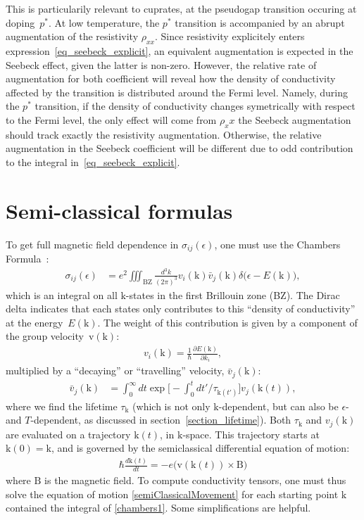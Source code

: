 \documentclass[notitlepage,11pt,nofootinbib]{revtex4-1}
\renewcommand{\vec}[1]{\bm{\mathrm{#1}}}
\begin{document}
This is particularily relevant to cuprates, at the pseudogap transition occuring at doping~$p^*$. At low temperature, the $p^*$ transition is accompanied by an abrupt augmentation of the resistivity $\rho_{xx}$. Since resistivity explicitely enters expression~\eqref{eq_seebeck_explicit}, an equivalent augmentation is expected in the Seebeck effect, given the latter is non-zero. However, the relative rate of augmentation for both coefficient will reveal how the density of conductivity affected by the transition is distributed around the Fermi level. Namely, during the $p^*$ transition, if the density of conductivity changes symetrically with respect to the Fermi level, the only effect will come from $\rho_xx$ the Seebeck augmentation should track exactly the resistivity augmentation. Otherwise, the relative augmentation in the Seebeck coefficient will be different due to odd contribution to the integral in~\eqref{eq_seebeck_explicit}.



\section{Semi-classical formulas}
\noindent
To get full magnetic field dependence in $\sigma_{ij}(\epsilon)$, one must use the Chambers Formula~\cite{ashcroft_solid_1976}:
\begin{align}
\sigma_{ij}(\epsilon) 
&=
e^2\iiint_{\text{BZ}}\frac{d^3k}{(2\pi)^3}
v_{i}(\vec k)\bar{v}_{j}(\vec k)
\delta\big(\epsilon-E(\vec k)\big),
\label{chambers1}
\end{align}
which is an integral on all $\vec k$-states in the first Brillouin zone (BZ). The Dirac delta indicates that each states only contributes to this ``density of conductivity'' at the energy~$E(\vec k)$. The weight of this contribution is given by a component of the group velocity~$\vec v(\vec k)$:
\begin{align}
v_{i}(\vec k) = \frac{1}{\hbar}\frac{\partial E(\vec k)}{\partial k_i},
\label{velocity}
\end{align}
multiplied by a ``decaying'' or ``travelling'' velocity, $\bar{v}_{j}(\vec k)$:
\begin{align}
\bar{v}_{j}(\vec k)
&=
\int_{0}^{\infty}dt
\exp\Big[
-\int_{0}^{t}dt'/\tau_{\vec k(t')}
\Big]
v_{j}(\vec k(t)),
\label{chambers2}
\end{align}
where we find the lifetime $\tau_{\vec k}$ (which is not only $\vec k$-dependent, but can also be $\epsilon$- and $T$-dependent, as discussed in section~\ref{section_lifetime}). Both $\tau_{\vec k}$ and $v_j(\vec k)$ are evaluated on a trajectory $\vec k(t)$, in $\vec k$-space. This trajectory starts at $\vec k(0)=\vec k$, and is governed by the semiclassical differential equation of motion:
\begin{align}
\hbar\frac{d\vec k(t)}{dt} =
-e \big(\vec v(\vec k(t))\times\vec B \big)
\label{semiClassicalMovement}
\end{align}
where $\vec B$ is the magnetic field. To compute conductivity tensors, one must thus solve the equation of motion \eqref{semiClassicalMovement} for each starting point $\vec k$ contained the integral of \eqref{chambers1}. Some simplifications are helpful.
\end{document}
